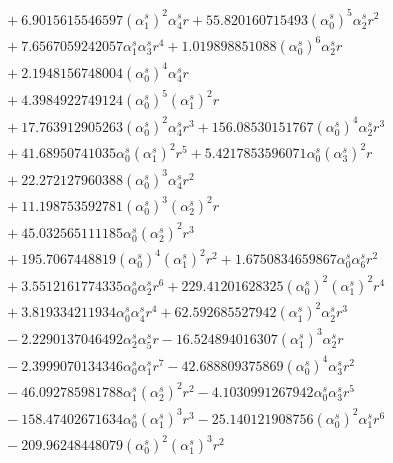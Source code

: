 \documentclass[10pt]{article}
\begin{document}
\begin{align*}
&{}  + 6.9015615546597 \left(\alpha_{1}^s\right)^{2} \alpha_{4}^s r + 55.820160715493 \left(\alpha_{0}^s\right)^{5} \alpha_{2}^s r^{2} \\
&{}  + 7.6567059242057 \alpha_{1}^s \alpha_{3}^s r^{4} + 1.019898851088 \left(\alpha_{0}^s\right)^{6} \alpha_{2}^s r \\
&{}  + 2.1948156748004 \left(\alpha_{0}^s\right)^{4} \alpha_{4}^s r \\
&{}  + 4.3984922749124 \left(\alpha_{0}^s\right)^{5} \left(\alpha_{1}^s\right)^{2} r \\
&{}  + 17.763912905263 \left(\alpha_{0}^s\right)^{2} \alpha_{4}^s r^{3} + 156.08530151767 \left(\alpha_{0}^s\right)^{4} \alpha_{2}^s r^{3} \\
&{}  + 41.68950741035 \alpha_{0}^s \left(\alpha_{1}^s\right)^{2} r^{5} + 5.4217853596071 \alpha_{0}^s \left(\alpha_{3}^s\right)^{2} r \\
&{}  + 22.272127960388 \left(\alpha_{0}^s\right)^{3} \alpha_{4}^s r^{2} \\
&{}  + 11.198753592781 \left(\alpha_{0}^s\right)^{3} \left(\alpha_{2}^s\right)^{2} r \\
&{}  + 45.032565111185 \alpha_{0}^s \left(\alpha_{2}^s\right)^{2} r^{3} \\
&{}  + 195.7067448819 \left(\alpha_{0}^s\right)^{4} \left(\alpha_{1}^s\right)^{2} r^{2} + 1.6750834659867 \alpha_{0}^s \alpha_{6}^s r^{2} \\
&{}  + 3.5512161774335 \alpha_{0}^s \alpha_{2}^s r^{6} + 229.41201628325 \left(\alpha_{0}^s\right)^{2} \left(\alpha_{1}^s\right)^{2} r^{4} \\
&{}  + 3.819334211934 \alpha_{0}^s \alpha_{4}^s r^{4} + 62.592685527942 \left(\alpha_{1}^s\right)^{2} \alpha_{2}^s r^{3} \\
&{}  - 2.2290137046492 \alpha_{2}^s \alpha_{5}^s r - 16.524894016307 \left(\alpha_{1}^s\right)^{3} \alpha_{2}^s r \\
&{}  - 2.3999070134346 \alpha_{0}^s \alpha_{1}^s r^{7} - 42.688809375869 \left(\alpha_{0}^s\right)^{4} \alpha_{3}^s r^{2} \\
&{}  - 46.092785981788 \alpha_{1}^s \left(\alpha_{2}^s\right)^{2} r^{2} - 4.1030991267942 \alpha_{0}^s \alpha_{3}^s r^{5} \\
&{}  - 158.47402671634 \alpha_{0}^s \left(\alpha_{1}^s\right)^{3} r^{3} - 25.140121908756 \left(\alpha_{0}^s\right)^{2} \alpha_{1}^s r^{6} \\
&{}  - 209.96248448079 \left(\alpha_{0}^s\right)^{2} \left(\alpha_{1}^s\right)^{3} r^{2} \\

\end{align*}
\end{document}
